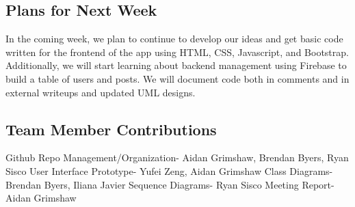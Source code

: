 \documentclass[12pt]{article}
\begin{document}
\subsection{Plans for Next Week}
In the coming week, we plan to continue to develop our ideas and get basic code written for the frontend of the app using HTML, CSS, Javascript, and Bootstrap. Additionally, we will start learning about backend management using Firebase to build a table of users and posts. We will document code both in comments and in external writeups and updated UML designs.

\subsection{Team Member Contributions}
Github Repo Management/Organization- Aidan Grimshaw, Brendan Byers, Ryan Sisco\newline
User Interface Prototype- Yufei Zeng, Aidan Grimshaw\newline
Class Diagrams- Brendan Byers, Iliana Javier\newline
Sequence Diagrams- Ryan Sisco\newline
Meeting Report- Aidan Grimshaw\newline
\end{document}
